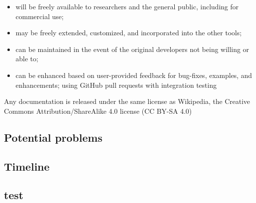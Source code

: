 \documentclass[11pt,notitlepage]{article}
\begin{document}
\begin{itemize}
\item 
 will be freely available to researchers and the general public, including for commercial use; 
\item
 may be freely extended, customized, and incorporated into the other tools; 
\item 
can be maintained in the event of the original developers not being willing
or able to; 
\item 
can be enhanced based on user-provided feedback for bug-fixes, examples, and enhancements; using GitHub pull requests with integration testing
\end{itemize}

Any documentation is released under the same license as Wikipedia, the Creative Commons Attribution/ShareAlike 4.0 license (CC BY-SA 4.0)\cite{Creativecommonsorg2015}

\subsection*{Potential problems}
\subsection*{Timeline}




\begin{table}[]
\caption{Timeline: The above timeline outlines our targets and milestones over the five year grant period.}
\label{Timeline}
\end{table}

\subsection*{test}
\end{document}

